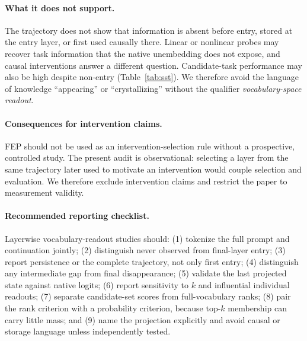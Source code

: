\documentclass[11pt]{article}
\begin{document}
\paragraph{What it does not support.}
The trajectory does not show that information is absent before entry, stored at the entry layer, or first used causally there. Linear or nonlinear probes may recover task information that the native unembedding does not expose, and causal interventions answer a different question. Candidate-task performance may also be high despite non-entry (Table~\ref{tab:sst}). We therefore avoid the language of knowledge ``appearing'' or ``crystallizing'' without the qualifier \emph{vocabulary-space readout}.

\paragraph{Consequences for intervention claims.}
FEP should not be used as an intervention-selection rule without a prospective, controlled study. The present audit is observational: selecting a layer from the same trajectory later used to motivate an intervention would couple selection and evaluation. We therefore exclude intervention claims and restrict the paper to measurement validity.

\paragraph{Recommended reporting checklist.}
Layerwise vocabulary-readout studies should: (1) tokenize the full prompt and continuation jointly; (2) distinguish never observed from final-layer entry; (3) report persistence or the complete trajectory, not only first entry; (4) distinguish any intermediate gap from final disappearance; (5) validate the last projected state against native logits; (6) report sensitivity to $k$ and influential individual readouts; (7) separate candidate-set scores from full-vocabulary ranks; (8) pair the rank criterion with a probability criterion, because top-$k$ membership can carry little mass; and (9) name the projection explicitly and avoid causal or storage language unless independently tested.
\end{document}
